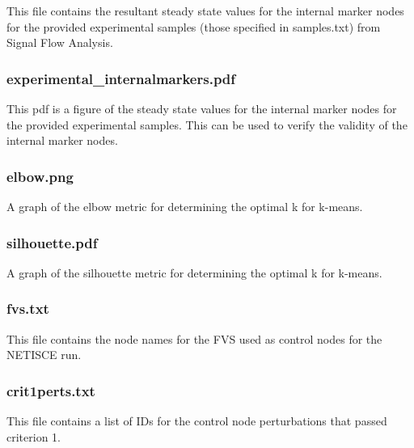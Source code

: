 \documentclass[
]{book}
\begin{document}
This file contains the resultant steady state values for the internal marker nodes for the provided experimental samples (those specified in samples.txt) from Signal Flow Analysis.

\hypertarget{section-id}{%
\subsubsection*{experimental\_internalmarkers.pdf}\label{section-id}}

This pdf is a figure of the steady state values for the internal marker nodes for the provided experimental samples. This can be used to verify the validity of the internal marker nodes.

\hypertarget{section-id}{%
\subsubsection*{elbow.png}\label{section-id}}

A graph of the elbow metric for determining the optimal k for k-means.

\hypertarget{section-id}{%
\subsubsection*{silhouette.pdf}\label{section-id}}

A graph of the silhouette metric for determining the optimal k for k-means.

\hypertarget{section-id}{%
\subsubsection*{fvs.txt}\label{section-id}}

This file contains the node names for the FVS used as control nodes for the NETISCE run.

\hypertarget{section-id}{%
\subsubsection*{crit1perts.txt}\label{section-id}}

This file contains a list of IDs for the control node perturbations that passed criterion 1.
\end{document}
